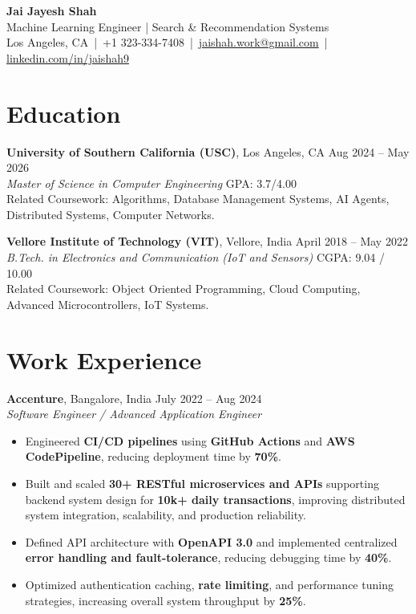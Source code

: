 \documentclass[letterpaper,11pt]{article}
\begin{document}
\begin{center}
    {\LARGE \textbf{Jai Jayesh Shah}}\\
    {\normalsize Machine Learning Engineer | Search \& Recommendation Systems}\\
    \small
    Los Angeles, CA \,|\, +1 323-334-7408 \,|\, \href{mailto:jaishah.work@gmail.com}{jaishah.work@gmail.com} \,|\, \href{https://www.linkedin.com/in/jaishah9}{linkedin.com/in/jaishah9}
\end{center}
\vspace{-13pt}

\section*{Education}
\textbf{University of Southern California (USC)}, Los Angeles, CA \hfill Aug 2024 -- May 2026 \\
\textit{Master of Science in Computer Engineering} \hfill GPA: 3.7/4.00 \\
Related Coursework: Algorithms, Database Management Systems, AI Agents, Distributed Systems, Computer Networks.

\textbf{Vellore Institute of Technology (VIT)}, Vellore, India \hfill April 2018 -- May 2022 \\
\textit{B.Tech. in Electronics and Communication (IoT and Sensors)} \hfill CGPA: 9.04 / 10.00 \\
Related Coursework: Object Oriented Programming, Cloud Computing, Advanced Microcontrollers, IoT Systems.

\section*{Work Experience}
\textbf{Accenture}, Bangalore, India \hfill July 2022 -- Aug 2024 \\
\textit{Software Engineer / Advanced Application Engineer}
\begin{itemize}
    \item Engineered \textbf{CI/CD pipelines} using \textbf{GitHub Actions} and \textbf{AWS CodePipeline}, reducing deployment time by \textbf{70\%}.
    \item Built and scaled \textbf{30+ RESTful microservices and APIs} supporting backend system design for \textbf{10k+ daily transactions}, improving distributed system integration, scalability, and production reliability.
    \item Defined API architecture with \textbf{OpenAPI 3.0} and implemented centralized \textbf{error handling and fault-tolerance}, reducing debugging time by \textbf{40\%}.
    \item Optimized authentication caching, \textbf{rate limiting}, and performance tuning strategies, increasing overall system throughput by \textbf{25\%}.
\end{itemize}
\end{document}

